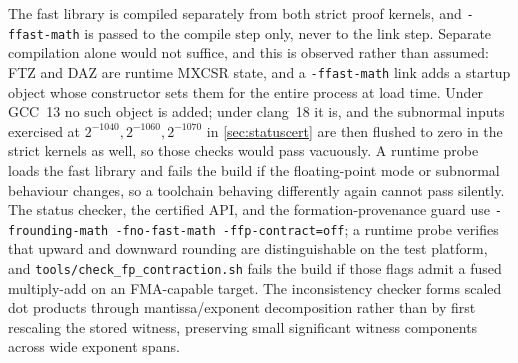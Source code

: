 \documentclass[11pt]{article}
\theoremstyle{definition}
\begin{document}
The fast library is compiled separately from both strict proof kernels, and \texttt{-ffast-math} is passed to the compile step only, never to the link step. Separate compilation alone would not suffice, and this is observed rather than assumed: FTZ and DAZ are runtime MXCSR state, and a \texttt{-ffast-math} link adds a startup object whose constructor sets them for the entire process at load time. Under GCC~13 no such object is added; under clang~18 it is, and the subnormal inputs exercised at $2^{-1040},2^{-1060},2^{-1070}$ in \cref{sec:statuscert} are then flushed to zero in the strict kernels as well, so those checks would pass vacuously. A runtime probe loads the fast library and fails the build if the floating-point mode or subnormal behaviour changes, so a toolchain behaving differently again cannot pass silently. The status checker, the certified API, and the formation-provenance guard use \texttt{-frounding-math -fno-fast-math -ffp-contract=off}; a runtime probe verifies that upward and downward rounding are distinguishable on the test platform, and \texttt{tools/check\_fp\_contraction.sh} fails the build if those flags admit a fused multiply-add on an FMA-capable target. The inconsistency checker forms scaled dot products through mantissa/exponent decomposition rather than by first rescaling the stored witness, preserving small significant witness components across wide exponent spans.
\end{document}
